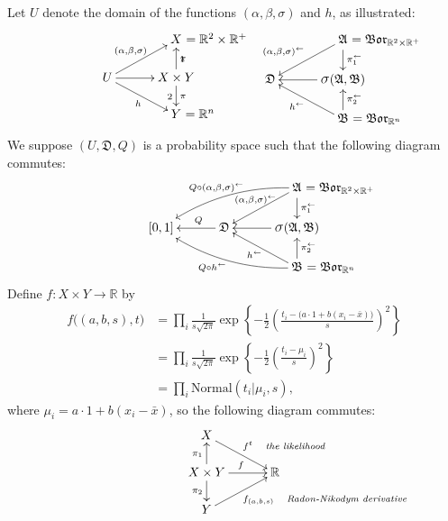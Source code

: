 \documentclass[
twoside=true,
paper=letter,
fontsize=11pt,
pagesize=auto,
leqno,
openany,
headsepline,
overfullrule,
]{scrbook}
\theoremstyle{plain}
\theoremstyle{plain}
\theoremstyle{definition}
\theoremstyle{bfnoteitalic}
\theoremstyle{bfnoteroman}
\newcommand{\sigalg}[1]{\mathfrak{#1}}
\newcommand{\borel}{\mathfrak{Bor}}
\newcommand{\sagb}{\mathop{\hbox{\large{$\sigma$}}}\nolimits}
\newcommand{\preimage}[1]{#1^{\leftarrow}}
\newcommand{\R}{\mathbb{R}}
\newcommand{\productsig}[2]{\sagb(#1,#2)}
\newcommand{\function}{f}
\newcommand{\measurespace}{X}
\newcommand{\measurespaceii}{Y}
\newcommand{\projectionone}{\pi_1}
\newcommand{\projectiontwo}{\pi_2}
\newcommand{\pspace}{\measurespace}%
\newcommand{\sspace}{\measurespaceii}%
\newcommand{\sspacesig}{\sigalg{B}}
\newcommand{\pspacesig}{\sigalg{A}}
\begin{document}
Let $U$ denote the domain of the functions $(\alpha, \beta,\sigma)$ and  $h$, as illustrated:
\[
\xymatrix@R=16pt@C=30pt{ 
 & \pspace \makebox[0pt][l]{ $=\R^2\times\R^+$}
 \\
 U \ar[ur]^{(\alpha, \beta,\sigma)}
 \ar[dr]_h
 \ar[r] &
 \pspace\times\sspace \ar[u]_\projectionone \ar[d]^\projectiontwo
 \\
  & \sspace\makebox[0pt][l]{ $= \R^n$}
  \\
}
%
\hspace{50pt}
%
\xymatrix@R=16pt@C=30pt{ 
 & \pspacesig \makebox[0pt][l]{ $=\borel_{\R^2\times\R^+}$}
 \ar[dl]_{\makebox[0pt][r]{$\scriptstyle\preimage{(\alpha,\beta,\sigma)}$}}
 \ar[d]^{\preimage{\projectionone}}
 \\
 \sigalg{D}  & 
 \productsig{\pspacesig}{\sspacesig} 
 \ar[l]  
 \\
  & \sspacesig \makebox[0pt][l]{ $=\borel_{\R^n}$}
  \ar[u]_{\preimage{\projectiontwo}}
  \ar[ul]^{\makebox[0pt][r]{$\scriptstyle\preimage{h}$}}
  \\
}
\]
We suppose $(U,\sigalg{D},Q)$ is a probability space such that the following diagram commutes:
\[
\xymatrix@R=16pt@C=30pt{ 
 & & \pspacesig \rlap{ $=\borel_{\R^2\times\R^+}$}
 \ar[dl]_{\kern30pt\preimage{(\alpha,\beta,\sigma)}} 
 \ar[d]^{\preimage{\projectionone}}
 \ar@/_10pt/[lld]_{Q\circ \preimage{(\alpha,\beta,\sigma)}}
 \\
 [0,1] & \sigalg{D} \ar[l]_-{\ Q} & 
 \productsig{\pspacesig}{\sspacesig} 
 \ar[l]  
 \\
 & & \sspacesig \rlap{ $=\borel_{\R^n}$}
  \ar[u]_{\preimage{\projectiontwo}}
  \ar[ul]^{\preimage{h}}
  \ar@/^10pt/[llu]^{Q\circ\preimage{h}\quad}
  \\
}
\]
Define $\function:\pspace \times \sspace \to\R$ by
\begin{align*}
\function\bigl((a,b,s),t\bigr)
& =
\prod_i
\frac{1}{s\sqrt{2\pi}}
\exp
\left\{
-\frac{1}{2}
\left(
\frac{t_i-\bigl( a\cdot 1 + b(x_i-\bar x) \bigr)}{s}
\right)^2
\right\} \\
& = 
\prod_i
\frac{1}{s\sqrt{2\pi}}
\exp
\left\{
-\frac{1}{2}
\left(
\frac{t_i-\mu_i}{s}
\right)^2
\right\} \\
& =
\prod_i
\text{Normal}(t_i\vert \mu_i, s),
\end{align*}
where $\mu_i=a\cdot 1 + b(x_i-\bar x)$,
so the following diagram commutes:
\[
\xymatrix@R=16pt@C=30pt{ 
\pspace
\ar[dr]^{\makebox[0pt][l]{$\scriptstyle{\function^t \quad \emph{\scriptsize the likelihood}}$}}
& \\
\pspace\times\sspace 
\ar[u]^{\projectionone}
\ar[d]_{\projectiontwo}
\ar[r]^{\function}
& \R \\
\sspace 
\ar[ur]_{\makebox[0pt][l]{$\scriptstyle{\function_{(a,b,s)} \quad \emph{\scriptsize Radon-Nikodym derivative}}$}}
& 
}
\]
\end{document}
